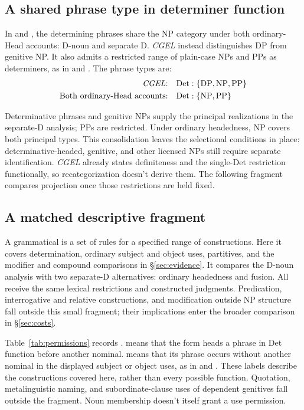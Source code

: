 \documentclass[12pt]{article}
\begin{document}
\subsection{A shared phrase type in determiner function}\label{sec:det-uniform}

In  and , the determining phrases share the NP category under both ordinary-Head accounts: D-noun and separate D. \textit{CGEL} instead distinguishes DP from genitive NP. It also admits a restricted range of plain-case NPs and PPs as determiners, as in  and  \citep[Ch.~5, §4]{huddleston2002}. The phrase types are:
\[
\begin{aligned}
\text{\textit{CGEL}:} &\quad \mathrm{Det}:\{\mathrm{DP},\mathrm{NP},\mathrm{PP}\} \\
\text{Both ordinary-Head accounts:} &\quad \mathrm{Det}:\{\mathrm{NP},\mathrm{PP}\}
\end{aligned}
\]

Determinative phrases and genitive NPs supply the principal realizations in the separate-D analysis; PPs are restricted. Under ordinary headedness, NP covers both principal types. This consolidation leaves the selectional conditions in place: determinative-headed, genitive, and other licensed NPs still require separate identification. \textit{CGEL} already states definiteness and the single-Det restriction functionally, so recategorization doesn't derive them. The following fragment compares projection once those restrictions are held fixed.

\subsection{A matched descriptive fragment}\label{sec:fragment}

A grammatical  is a set of rules for a specified range of constructions. Here it covers determination, ordinary subject and object uses, partitives, and the modifier and compound comparisons in §\ref{sec:evidence}. It compares the D-noun analysis with two separate-D alternatives: ordinary headedness and fusion. All receive the same lexical restrictions and constructed judgments. Predication, interrogative and relative constructions, and modification outside NP structure fall outside this small fragment; their implications enter the broader comparison in §\ref{sec:costs}.

Table~\ref{tab:permissions} records .  means that the form heads a phrase in Det function before another nominal.  means that its phrase occurs without another nominal in the displayed subject or object uses, as in  and . These labels describe the constructions covered here, rather than every possible function. Quotation, metalinguistic naming, and subordinate-clause uses of dependent genitives fall outside the fragment. Noun membership doesn't itself grant a use permission.
\end{document}
